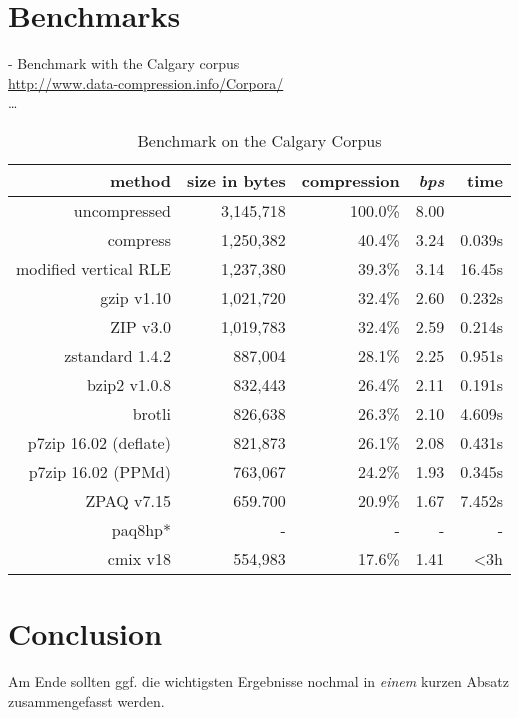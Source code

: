 \section{Benchmarks}
\label{ch:Evaluation:sec:Benchmarks}
- Benchmark with the Calgary corpus\\
\url{http://www.data-compression.info/Corpora/} \\
\ldots

	\begin{table}[h]
	\begin{tabular}{r|r|r|r|r}
		method  &  size in bytes & compression & \textit{bps}& time\\
		\hline
		uncompressed & 3,145,718 & 100.0\% & 8.00 &\\
		compress & 1,250,382 & 40.4\% & 3.24 & 0.039s\\
		modified vertical RLE & 1,237,380 & 39.3\%& 3.14 & 16.45s\\
		gzip v1.10 & 1,021,720 & 32.4\% & 2.60 & 0.232s\\
		ZIP v3.0 & 1,019,783 & 32.4\% & 2.59 & 0.214s\\
		zstandard 1.4.2& 887,004 & 28.1\% & 2.25 & 0.951s\\
		bzip2 v1.0.8 & 832,443 & 26.4\% & 2.11 & 0.191s\\
		brotli & 826,638 & 26.3\%& 2.10 & 4.609s\\
		p7zip 16.02 (deflate) &  821,873 & 26.1\% & 2.08 & 0.431s \\
		p7zip 16.02 (PPMd) &  763,067& 24.2\% & 1.93 & 0.345s\\
		ZPAQ v7.15 & 659.700 & 20.9\% & 1.67 & 7.452s \\
		paq8hp* & - & - & - & - \\ 
		cmix v18 & 554,983 & 17.6\% & 1.41 & <3h		
	\end{tabular}
	\label{tab:t100benchmark}
	\caption{Benchmark on the Calgary Corpus}
\end{table}
\section{Conclusion}
\label{ch:Evaluation:sec:Conclusion}

Am Ende sollten ggf. die wichtigsten Ergebnisse nochmal in \emph{einem} kurzen Absatz zusammengefasst werden.

